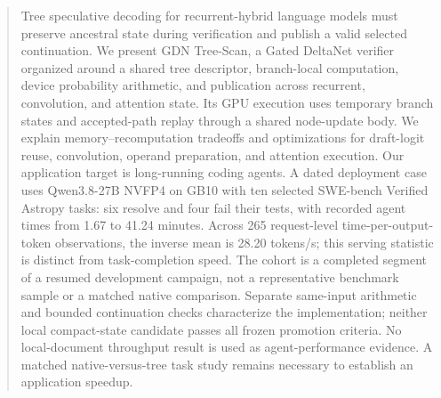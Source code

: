 \begin{abstract}
Tree speculative decoding for recurrent-hybrid language models must preserve ancestral state during verification and publish a valid selected continuation. We present GDN Tree-Scan, a Gated DeltaNet verifier organized around a shared tree descriptor, branch-local computation, device probability arithmetic, and publication across recurrent, convolution, and attention state. Its GPU execution uses temporary branch states and accepted-path replay through a shared node-update body. We explain memory--recomputation tradeoffs and optimizations for draft-logit reuse, convolution, operand preparation, and attention execution. Our application target is long-running coding agents. A dated deployment case uses Qwen3.8-27B NVFP4 on GB10 with ten selected SWE-bench Verified Astropy tasks: six resolve and four fail their tests, with recorded agent times from 1.67 to 41.24 minutes. Across 265 request-level time-per-output-token observations, the inverse mean is 28.20 tokens/s; this serving statistic is distinct from task-completion speed. The cohort is a completed segment of a resumed development campaign, not a representative benchmark sample or a matched native comparison. Separate same-input arithmetic and bounded continuation checks characterize the implementation; neither local compact-state candidate passes all frozen promotion criteria. No local-document throughput result is used as agent-performance evidence. A matched native-versus-tree task study remains necessary to establish an application speedup.
\end{abstract}
